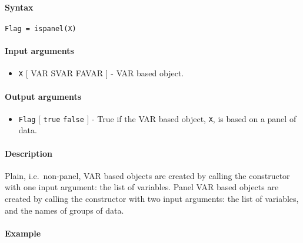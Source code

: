 


	\paragraph{Syntax}

\begin{verbatim}
Flag = ispanel(X)
\end{verbatim}

\paragraph{Input arguments}

\begin{itemize}
\itemsep1pt\parskip0pt
\item
  \texttt{X} {[} VAR \textbar{} SVAR \textbar{} FAVAR {]} - VAR based
  object.
\end{itemize}

\paragraph{Output arguments}

\begin{itemize}
\itemsep1pt\parskip0pt
\item
  \texttt{Flag} {[} \texttt{true} \textbar{} \texttt{false} {]} - True
  if the VAR based object, \texttt{X}, is based on a panel of data.
\end{itemize}

\paragraph{Description}

Plain, i.e.~non-panel, VAR based objects are created by calling the
constructor with one input argument: the list of variables. Panel VAR
based objects are created by calling the constructor with two input
arguments: the list of variables, and the names of groups of data.

\paragraph{Example}


